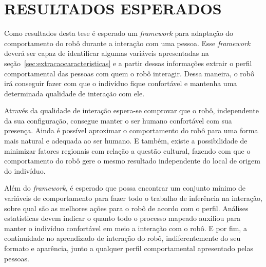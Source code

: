 \chapter{RESULTADOS ESPERADOS}
\label{cap:resultados}
Como resultados desta tese é esperado um \emph{framework} para adaptação do comportamento do robô durante a interação com uma pessoa. Esse \emph{framework} deverá ser capaz de identificar algumas variáveis apresentadas na seção~\ref{sec:extracaocaracteristicas} e a partir dessas informações extrair o perfil comportamental das pessoas com quem o robô interagir. Dessa maneira, o robô irá conseguir fazer com que o indivíduo fique confortável e mantenha uma determinada qualidade de interação com ele. 

Através da qualidade de interação espera-se comprovar que o robô, independente da sua configuração, consegue manter o ser humano confortável com sua presença. Ainda é possível aproximar o comportamento do robô para uma forma mais natural e adequada ao ser humano. E também, existe a possibilidade de minimizar fatores regionais com relação a questão cultural, fazendo com que o comportamento do robô gere o mesmo resultado independente do local de origem do indivíduo.

Além do \emph{framework}, é esperado que possa encontrar um conjunto mínimo de variáveis de comportamento para fazer todo o trabalho de inferência na interação, sobre qual são as melhores ações para o robô de acordo com o perfil. Análises estatísticas devem indicar o quanto todo o processo mapeado auxiliou para manter o indivíduo confortável em meio a interação com o robô. E por fim, a continuidade no aprendizado de interação do robô, indiferentemente do seu formato e aparência, junto a qualquer perfil comportamental apresentado pelas pessoas.
